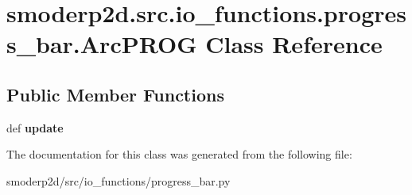 \hypertarget{classsmoderp2d_1_1src_1_1io__functions_1_1progress__bar_1_1ArcPROG}{\section{smoderp2d.\-src.\-io\-\_\-functions.\-progress\-\_\-bar.\-Arc\-P\-R\-O\-G Class Reference}
\label{classsmoderp2d_1_1src_1_1io__functions_1_1progress__bar_1_1ArcPROG}
}
\subsection*{Public Member Functions}
\begin{DoxyCompactItemize}
\item 
\hypertarget{classsmoderp2d_1_1src_1_1io__functions_1_1progress__bar_1_1ArcPROG_a512dbca9e017ee59cf367f2de6c1bea4}{def {\bfseries update}}\label{classsmoderp2d_1_1src_1_1io__functions_1_1progress__bar_1_1ArcPROG_a512dbca9e017ee59cf367f2de6c1bea4}

\end{DoxyCompactItemize}


The documentation for this class was generated from the following file\-:\begin{DoxyCompactItemize}
\item 
smoderp2d/src/io\-\_\-functions/progress\-\_\-bar.\-py\end{DoxyCompactItemize}
